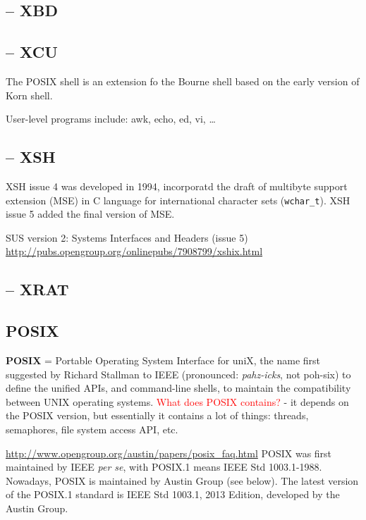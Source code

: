 \subsection{-- XBD}
\label{sec:XBD}

\subsection{-- XCU}
\label{sec:XCU}

The POSIX shell is an extension fo the Bourne shell based on the early version
of Korn shell. 

User-level programs include: awk, echo, ed, vi, \ldots



\subsection{-- XSH}
\label{sec:XSH}

XSH issue 4 was developed in 1994, incorporatd the draft of multibyte support
extension (MSE) in C language for international character sets (\verb!wchar_t!).
XSH issue 5 added the final version of MSE.

SUS version 2:
Systems Interfaces and Headers (issue 5)
\url{http://pubs.opengroup.org/onlinepubs/7908799/xshix.html}


\subsection{-- XRAT}
\label{sec:XRAT}

\subsection{POSIX}
\label{sec:POSIX}

{\bf POSIX} = Portable Operating System Interface for uniX, the name first
suggested by Richard Stallman to IEEE (pronounced: {\it pahz-icks}, not poh-six)
to define the unified APIs, and command-line shells, to maintain the
compatibility between UNIX operating systems.
\textcolor{red}{What does POSIX contains?} - it depends on the POSIX version,
but essentially it contains a lot of things: threads, semaphores, file system
access API, etc.

\url{http://www.opengroup.org/austin/papers/posix_faq.html} POSIX was first
maintained by IEEE {\it per se}, with POSIX.1 means IEEE Std 1003.1-1988.
Nowadays, POSIX is maintained by Austin Group (see below).
The latest version of the POSIX.1 standard is IEEE Std 1003.1, 2013 Edition,
developed by the Austin Group.

